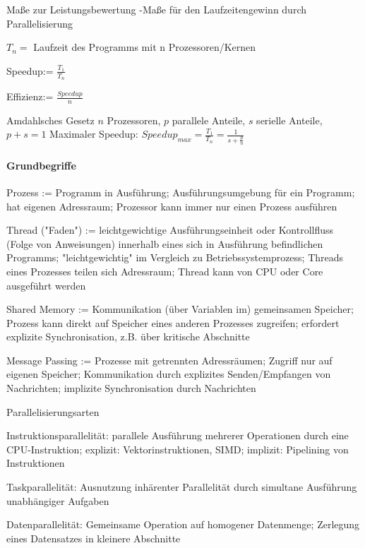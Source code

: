\documentclass[10pt]{article}
\begin{document}
\begin{itemize*}
Maße zur Leistungsbewertung
-Maße für den Laufzeitengewinn durch Parallelisierung
\begin{itemize*}
  \item $T_n=$ Laufzeit des Programms mit n Prozessoren/Kernen
  \item Speedup:= $\frac{T_1}{T_n}$
  \item Effizienz:= $\frac{Speedup}{n}$
\end{itemize*}

Amdahlsches Gesetz
$n$ Prozessoren, $p$ parallele Anteile, $s$ serielle Anteile, $p+s=1$
Maximaler Speedup: $Speedup_{max}=\frac{T_1}{T_n}=\frac{1}{s+\frac{p}{n}}$

\paragraph{Grundbegriffe}
\begin{itemize*}
  \item Prozess := Programm in Ausführung; Ausführungsumgebung für ein Programm; hat eigenen Adressraum; Prozessor kann immer nur einen Prozess ausführen
  \item Thread ("Faden") := leichtgewichtige Ausführungseinheit oder Kontrollfluss (Folge von Anweisungen) innerhalb eines sich in Ausführung befindlichen Programms; "leichtgewichtig" im Vergleich zu Betriebssystemprozess; Threads eines Prozesses teilen sich Adressraum; Thread kann von CPU oder Core ausgeführt werden
  \item Shared Memory := Kommunikation (über Variablen im) gemeinsamen Speicher; Prozess kann direkt auf Speicher eines anderen Prozesses zugreifen; erfordert explizite Synchronisation, z.B. über kritische Abschnitte
  \item Message Passing := Prozesse mit getrennten Adressräumen; Zugriff nur auf eigenen Speicher; Kommunikation durch explizites Senden/Empfangen von Nachrichten; implizite Synchronisation durch Nachrichten
  \item Parallelisierungsarten
  \begin{itemize*}
    \item Instruktionsparallelität: parallele Ausführung mehrerer Operationen durch eine CPU-Instruktion; explizit: Vektorinstruktionen, SIMD; implizit: Pipelining von Instruktionen
    \item Taskparallelität: Ausnutzung inhärenter Parallelität durch simultane Ausführung unabhängiger Aufgaben
    \item Datenparallelität: Gemeinsame Operation auf homogener Datenmenge; Zerlegung eines Datensatzes in kleinere Abschnitte
  \end{itemize*}
\end{itemize*}


\end{itemize*}
\end{document}
